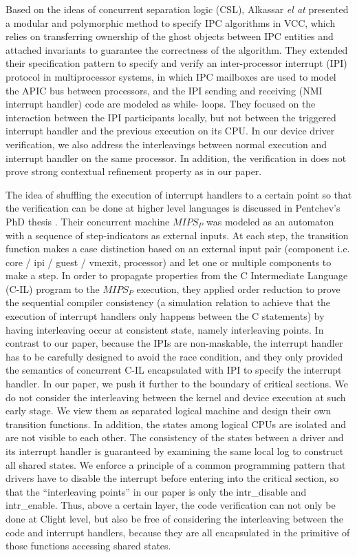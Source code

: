 Based on the ideas of concurrent separation logic (CSL), Alkassar {\em el at}
\cite{Alkassar:IPC}
presented a modular and polymorphic method to specify IPC algorithms in VCC,
which relies on transferring ownership of the ghost objects between IPC
entities and attached invariants to guarantee the correctness of the
algorithm. They extended their specification pattern to specify and verify an
inter-processor interrupt (IPI) protocol in multiprocessor systems, in which
IPC mailboxes are used to model the APIC bus between processors, and the IPI
sending and receiving (NMI interrupt handler) code are modeled as while-
loops. They focused on the interaction between the IPI participants locally,
but not between the triggered interrupt handler and the previous execution on
its CPU. In our device driver verification, we also address the interleavings
between normal execution and interrupt handler on the same processor.
In addition, the verification in \cite{Alkassar:IPC} does not
prove strong contextual refinement property as in our paper.

The idea of shuffling the execution of interrupt handlers to a certain point
so that the verification can be done at higher level languages is discussed in
Pentchev's PhD thesis \cite{Pentchev:2016}. Their concurrent machine $MIPS_{P}$
was modeled as an
automaton with a sequence of step-indicators as external inputs. At each step,
the transition function makes a case distinction based on an external input
pair (component i.e. core / ipi / guest / vmexit, processor) and let one or
multiple components to make a step. In order to propagate properties from the C
Intermediate Language (C-IL) program to the $MIPS_{P}$ execution, they applied
order reduction to prove the sequential compiler consistency (a simulation
relation to achieve that the execution of interrupt handlers only happens
between the C statements) by having interleaving occur at consistent state,
namely interleaving points. In contrast to our paper, because the IPIs are
non-maskable, the interrupt handler has to be carefully designed to avoid the
race condition, and they only provided the semantics of concurrent C-IL
encapsulated with IPI to specify the interrupt handler. In our paper, we push
it further to the boundary of critical sections. We do not consider the
interleaving between the kernel and device execution at such early stage. We
view them as separated logical machine and design their own transition functions.
In addition, the states among logical CPUs are isolated and are not visible
to each other. The consistency of the states between a driver and its
interrupt handler is guaranteed by examining the same local log to construct
all shared states. We enforce a principle of a common programming pattern that
drivers have to disable the interrupt before entering into the critical section,
so that the ``interleaving points'' in our paper is only the \textsf{intr\_disable} and
\textsf{intr\_enable}. Thus, above a certain layer, the code verification can not only
be done at Clight level, but also be free of considering the interleaving between
the code and interrupt handlers, because they are all encapsulated in the primitive of
those functions accessing shared states.

